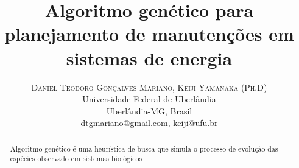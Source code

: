 \documentclass[twoside]{article}
\title{\vspace{-15mm}\fontsize{24pt}{10pt}\selectfont\textbf{Algoritmo genético para planejamento de manutenções em sistemas de energia}} %
\author{
\large
\textsc{Daniel Teodoro Gonçalves Mariano, Keiji Yamanaka (Ph.D)}\\[2mm] %
\normalsize Universidade Federal de Uberlândia\\ \normalsize Uberlândia-MG, Brasil \\ %
\normalsize {dtgmariano@gmail.com, keiji@ufu.br} %
\vspace{-5mm}
}
\date{}
\begin{document}
\maketitle %

\thispagestyle{fancy} %



\begin{abstract}
\noindent
Algoritmo genético é uma heurística de busca que simula o processo de evolução das espécies observado em sistemas biológicos
\end{abstract}

\end{document}
